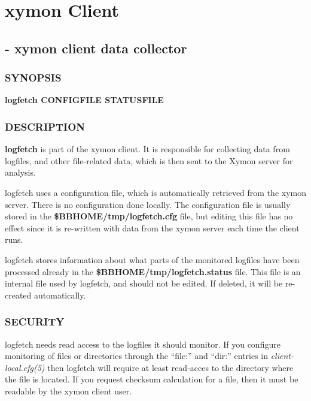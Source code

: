 %
\chapter{xymon Client}

%
\section{ - xymon client data collector }

 
\subsection{SYNOPSIS}
\textbf{logfetch CONFIGFILE STATUSFILE}


 
\subsection{DESCRIPTION}
\textbf{logfetch}
 is part of the xymon client. It is responsible for collecting data from logfiles, and other file-related data, which is then sent to the Xymon server for analysis. 

  logfetch uses a configuration file, which is automatically retrieved from the xymon server. There is no configuration done locally. The configuration file is usually stored in the \textbf{\$BBHOME/tmp/logfetch.cfg}
 file, but editing this file has no effect since it is re-written with data from the xymon server each time the client runs. 


  logfetch stores information about what parts of the monitored logfiles have been processed already in the \textbf{\$BBHOME/tmp/logfetch.status}
 file. This file is an internal file used by logfetch, and should not be edited. If deleted, it will be re-created automatically. 


 
\subsection{SECURITY}
 logfetch needs read access to the logfiles it should monitor. If you configure monitoring of files or directories through the ``file:'' and ``dir:'' entries in \emph{client-local.cfg(5)}
 then logfetch will require at least read-acces to the directory where the file is located. If you request checksum calculation for a file, then it must be readable by the xymon client user. 

